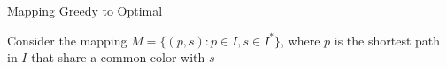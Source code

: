 \begin{frame}{Mapping Greedy to Optimal}

{Consider the mapping
$M = \{(p, s) : p \in I, s \in I^*\}$,
where $p$ is the shortest path in $I$ that share a common color with $s$}



\end{frame}